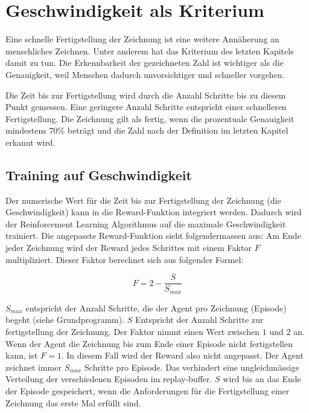 \section{Geschwindigkeit als Kriterium}
Eine schnelle Fertigstellung der Zeichnung ist eine weitere Annäherung an
menschliches Zeichnen. Unter anderem hat das Kriterium des letzten Kapitels
damit zu tun. Die Erkennbarkeit der gezeichneten Zahl ist wichtiger als die
Genauigkeit, weil Menschen dadurch unvorsichtiger und schneller vorgehen.

Die Zeit bis zur Fertigstellung wird durch die Anzahl Schritte bis zu diesem
Punkt gemessen. Eine geringere Anzahl Schritte entspricht einer schnelleren
Fertigstellung. Die Zeichnung gilt als fertig, wenn die prozentuale Genauigkeit
mindestens 70\% beträgt und die Zahl nach der Definition im letzten Kapitel
erkannt wird. %

\subsection*{Training auf Geschwindigkeit}
Der numerische Wert für die Zeit bis zur Fertigstellung der Zeichnung (die
Geschwindigkeit) kann in die Reward-Funktion integriert werden. Dadurch wird der
Reinforcement Learning Algorithmus auf die maximale Geschwindigkeit trainiert.
Die angepasste Reward-Funktion sieht folgendermassen aus: Am Ende jeder
Zeichnung wird der Reward jedes Schrittes mit einem Faktor $F$ multipliziert. Dieser
Faktor berechnet sich aus folgender Formel:

$$ F = 2 - \frac{S}{S_{max}}$$

$S_{max}$ entspricht der Anzahl Schritte, die der Agent pro Zeichnung (Episode) begeht (siehe Grundprogramm). %
$S$ Entspricht der Anzahl Schritte zur fertigstellung der Zeichnung. Der Faktor
nimmt einen Wert zwischen $1$ und $2$ an. Wenn der Agent die Zeichnung bis zum
Ende einer Episode nicht fertigstellen kann, ist $F = 1$. In diesem Fall wird
der Reward also nicht angepasst. Der Agent zeichnet immer $S_{max}$ Schritte pro
Episode. Das verhindert eine ungleichmässige Verteilung der verschiedenen
Episoden im replay-buffer. $S$ wird bis an das Ende der Episode gespeichert,
wenn die Anforderungen für die Fertigstellung einer Zeichnung das erste Mal
erfüllt sind.












